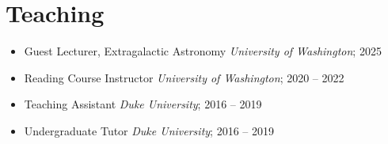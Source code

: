 \section{Teaching}
\begin{itemize}
    \item Guest Lecturer, Extragalactic Astronomy \hfill \textit{University of Washington}; 2025

    \item Reading Course Instructor \hfill \textit{University of Washington}; 2020 -- 2022

    \item Teaching Assistant \hfill \textit{Duke University}; 2016 -- 2019

    \item Undergraduate Tutor \hfill \textit{Duke University}; 2016 -- 2019
\end{itemize}
